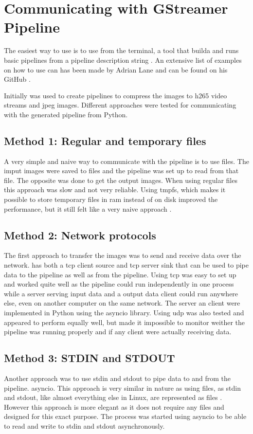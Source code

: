 \section{Communicating with GStreamer Pipeline}
The easiest way to use \gs is to use  from the terminal, a tool that builda and runs basic \gs pipelines from a pipeline description string \cite{Gstlaunch1}.
An extensive list of examples on how to use  can has been made by Adrian Lane and can be found on his GitHub \cite{laneGStreamerPipelineSamples2020}.

Initially  was used to create pipelines to compress the images to \gls{h265} video streams and \gls{jpeg} images.
Different approaches were tested for communicating with the generated pipeline from Python.

\subsection{Method 1: Regular and temporary files}
A very simple and naive way to communicate with the pipeline is to use files.
The imput images were saved to files and the pipeline was set up to read from that file.
The opposite was done to get the output images.
When using regular files this approach was slow and not very reliable.
Using \gls{tmpfs}, which makes it possible to store temporary files in \gls{ram} instead of on disk improved the performance, but it still felt like a very naive approach \cite{dickinsTmpfsLinuxKernel2010}.

\subsection{Method 2: Network protocols}
The first approach to transfer the images was to send and receive data over the network.
\gs has both a \gls{tcp} client source and \gls{tcp} server sink that can be used to pipe data to the pipeline as well as from the pipeline.
Using \gls{tcp} was easy to set up and worked quite well as the pipeline could run independently in one process while a server serving input data and a output data client could run anywhere else, even on another computer on the same network.
The server an client were implemented in Python using the \gls{asyncio} library.
Using \gls{udp} was also tested and appeared to perform equally well, but made it impossible to monitor weither the pipeline was running properly and if any client were actually receiving data.


\subsection{Method 3: STDIN and STDOUT}
Another approach was to use \gls{stdin} and \gls{stdout} to pipe data to and from the pipeline.
\gls{asyncio}.
This approach is very similar in nature as using files, as \gls{stdin} and \gls{stdout}, like almost everything else in Linux, are represented as files \cite{mckayWhatAreStdin2020}.
However this approach is more elegant as it does not require any files and designed for this exact purpose.
The \gs process was started using \gls{asyncio} to be able to read and write to \gls{stdin} and \gls{stdout} asynchronously.


